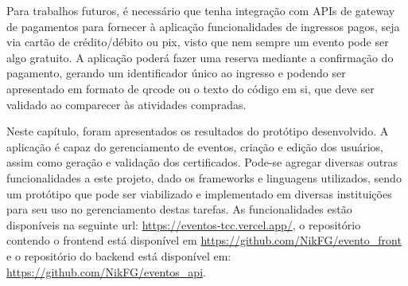 Para trabalhos futuros, é necessário que tenha integração com APIs de gateway de pagamentos para fornecer à aplicação funcionalidades de ingressos pagos, seja via cartão de crédito/débito ou pix, visto que nem sempre um evento pode ser algo gratuito. A aplicação poderá fazer uma reserva mediante a confirmação do pagamento, gerando um identificador único ao ingresso e podendo ser apresentado em formato de qrcode ou o texto do código em si, que deve ser validado ao comparecer às atividades compradas. 

Neste capítulo, foram apresentados os resultados do protótipo desenvolvido. A aplicação é capaz do gerenciamento de eventos, criação e edição dos usuários, assim como geração e validação dos certificados. Pode-se agregar diversas outras funcionalidades a este projeto, dado os frameworks e linguagens utilizados, sendo um protótipo que pode ser viabilizado e implementado em diversas instituições para seu uso no gerenciamento destas tarefas. As funcionalidades estão disponíveis na seguinte url: \url{https://eventos-tcc.vercel.app/}, o repositório contendo o frontend está disponível em \url{https://github.com/NikFG/evento_front} e o repositório do backend está disponível em: \url{https://github.com/NikFG/eventos_api}.

